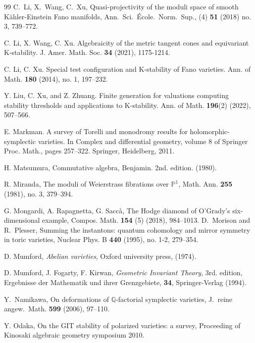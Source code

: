 \documentclass[12pt,twoside]{amsart}
\theoremstyle{definition}
\begin{document}
\begin{thebibliography}{99}
C.~Li, X.~Wang, C.~Xu, Quasi-projectivity of the moduli space of smooth Kähler-Einstein Fano manifolds, Ann.~Sci.~\'Ecole.~Norm.~Sup., (4) {\bf51} (2018) no. 3, 739--772.


 C. Li, X. Wang, C. Xu.  Algebraicity of the metric tangent cones and equivariant K-stability. J. Amer. Math. Soc. {\bf34} (2021), 1175-1214.

 C. Li, C. Xu. Special test configuration and K-stability of Fano varieties. Ann. of Math. {\bf 180} (2014), no. 1, 197--232.

 Y. Liu, C. Xu, and Z. Zhuang. Finite generation for valuations computing stability thresholds and applications to K-stability. Ann. of Math. {\bf196}(2) (2022), 507--566.



 E. Markman. A survey of Torelli and monodromy results for holomorphic-symplectic varieties. In Complex and differential geometry, volume 8 of Springer Proc. Math., pages 257–322. Springer, Heidelberg, 2011.

 H. Matsumura, Commutative algebra, Benjamin. 2nd. edition. (1980).



 R. Miranda, The moduli of Weierstrass fibrations over $\mathbb{P}^1$, Math. Ann. {\bf255} (1981), no. 3, 379--394.



G. Mongardi, A. Rapagnetta, G. Saccà, The Hodge diamond of O'Grady's six-dimensional example, Compos. Math. {\bf154} (5)
(2018), 984–1013.
D.~Morison and R.~Plesser, Summing the instantons: quantum cohomology and mirror symmetry in toric varieties, Nuclear Phys. B {\bf440} (1995), no. 1-2, 279–354.



 D. Mumford, {\it Abelian varieties}, Oxford university press, (1974).

 D. Mumford, J. Fogarty, F. Kirwan, {\it Geometric Invariant Theory}, 3rd. edition, Ergebnisse der Mathematik und ihrer Grenzgebiete, {\bf34}, Springer-Verlag (1994).



 Y.~Namikawa, On deformations of $\mathbb{Q}$-factorial symplectic varieties, J.~reine angew.~Math. {\bf599} (2006), 97--110.


 Y. Odaka, On the GIT stability of polarized varieties: a survey, Proceeding of Kinosaki algebraic geometry symposium 2010.



\end{thebibliography}
\end{document}
